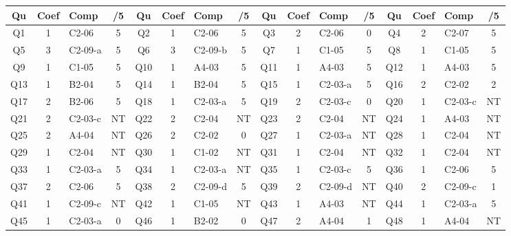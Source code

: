 \begin{center} 
\begin{tabular}{|c|c|m{1cm}|c||c|c|m{1cm}|c||c|c|m{1cm}|c||c|c|m{1cm}|c|} 
\hline \textbf{Qu} & \textbf{Coef} & \textbf{Comp} & \textbf{/5} & \textbf{Qu} & \textbf{Coef} & \textbf{Comp} & \textbf{/5} & \textbf{Qu} & \textbf{Coef} & \textbf{Comp} & \textbf{/5} & \textbf{Qu} & \textbf{Coef} & \textbf{Comp} & \textbf{/5} \\ 
\hline 
\hline 
Q1 & 1 & C2-06 & 5 & Q2 & 1 & C2-06 & 5 & Q3 & 2 & C2-06 & 0 & Q4 & 2 & C2-07 & 5 \\ \hline 
 
Q5 & 3 & C2-09-a & 5 & Q6 & 3 & C2-09-b & 5 & Q7 & 1 & C1-05 & 5 & Q8 & 1 & C1-05 & 5 \\ \hline 
 
Q9 & 1 & C1-05 & 5 & Q10 & 1 & A4-03 & 5 & Q11 & 1 & A4-03 & 5 & Q12 & 1 & A4-03 & 5 \\ \hline 
 
Q13 & 1 & B2-04 & 5 & Q14 & 1 & B2-04 & 5 & Q15 & 1 & C2-03-a & 5 & Q16 & 2 & C2-02 & 2 \\ \hline 
 
Q17 & 2 & B2-06 & 5 & Q18 & 1 & C2-03-a & 5 & Q19 & 2 & C2-03-c & 0 & Q20 & 1 & C2-03-c & NT \\ \hline 
 
Q21 & 2 & C2-03-c & NT & Q22 & 2 & C2-04 & NT & Q23 & 2 & C2-04 & NT & Q24 & 1 & A4-03 & NT \\ \hline 
 
Q25 & 2 & A4-04 & NT & Q26 & 2 & C2-02 & 0 & Q27 & 1 & C2-03-a & NT & Q28 & 1 & C2-04 & NT \\ \hline 
 
Q29 & 1 & C2-04 & NT & Q30 & 1 & C1-02 & NT & Q31 & 1 & C2-04 & NT & Q32 & 1 & C2-04 & NT \\ \hline 
 
Q33 & 1 & C2-03-a & 5 & Q34 & 1 & C2-03-a & NT & Q35 & 1 & C2-03-c & 5 & Q36 & 1 & C2-06 & 5 \\ \hline 
 
Q37 & 2 & C2-06 & 5 & Q38 & 2 & C2-09-d & 5 & Q39 & 2 & C2-09-d & NT & Q40 & 2 & C2-09-c & 1 \\ \hline 
 
Q41 & 1 & C2-09-c & NT & Q42 & 1 & C1-05 & NT & Q43 & 1 & A4-03 & NT & Q44 & 1 & C2-03-a & 5 \\ \hline 
 
Q45 & 1 & C2-03-a & 0 & Q46 & 1 & B2-02 & 0 & Q47 & 2 & A4-04 & 1 & Q48 & 1 & A4-04 & NT \\ \hline 
 
\end{tabular} 
\end{center} 
\normalsize 
 
